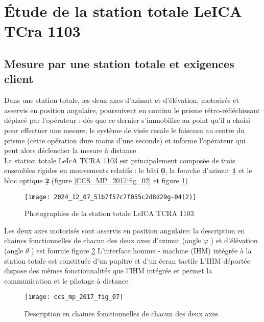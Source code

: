 \section{Étude de la station totale LeICA TCra 1103 \label{CCS_MP_2017:p4}}
\subsection{Mesure par une station totale et exigences client}

\ifprof
\else
Dans une station totale, les deux axes d'azimut et d'élévation, motorisés et asservis en position angulaire, poursuivent en continu le prisme rétro-réfléchissant déplacé par l'opérateur : dès que ce dernier s'immobilise au point qu'il a choisi pour effectuer une mesure, le système de visée recale le faisceau au centre du prisme (cette opération dure moins d'une seconde) et informe l'opérateur qui peut alors déclencher la mesure à distance\\
La station totale LeIcA TCRA 1103 est principalement composée de trois ensembles rigides en mouvements relatifs : le bâti $\underline{\mathbf{0}}$, la fourche d'azimut $\underline{\mathbf{1}}$ et le bloc optique $\underline{\mathbf{2}}$ (figure \ref{CCS_MP_2017:fig_02} et figure \ref{CCS_MP_2017:fig_06})\\

\begin{figure}[!h]
\centering
\texttt{[image: 2024\_12\_07\_51b7f57c7f055c2d8d29g-04(2)]}

\caption{Photographies de la station totale LeICA TCRA 1103 \label{CCS_MP_2017:fig_06}}
\end{figure}

Les deux axes motorisés sont asservis en position angulaire: la description en chaines fonctionnelles de chacun des deux axes d'azimut (angle $\varphi$ ) et d'élévation (angle $\theta$ ) est fournie figure \ref{CCS_MP_2017:fig_07} L'interface homme - machine (IHM) intégrée à la station totale est constituée d'un pupitre et d'un écran tactile L'IHM déportée dispose des mêmes fonctionnalités que l'IHM intégrée et permet la communication et le pilotage à distance\\

\begin{figure}[!h]
\centering
\texttt{[image: ccs\_mp\_2017\_fig\_07]}

\caption{Description en chaines fonctionnelles de chacun des deux axes
\label{CCS_MP_2017:fig_07}}
\end{figure}

